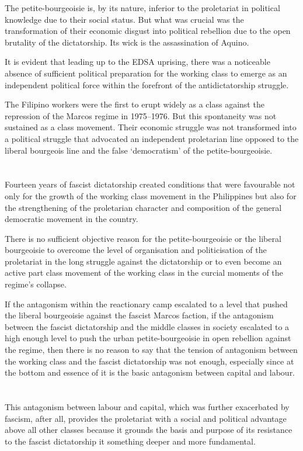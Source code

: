The petite-bourgeoisie is, by its nature,
inferior to the proletariat 
in political knowledge 
due to their social status. 
But what was crucial was the transformation 
of their economic disgust into political rebellion 
due to the open brutality of the dictatorship. 
Its wick is the assassination of Aquino.

It is evident that leading up to the EDSA uprising, 
there was a noticeable absence of 
sufficient political preparation for 
the working class to emerge 
as an independent political force 
within the forefront of the antidictatorship struggle.

The Filipino workers were the first to erupt 
widely as a class against the repression 
of the Marcos regime in 1975--1976. 
But this spontaneity was not sustained as a class movement. 
Their economic struggle was not transformed 
into a political struggle 
that advocated an independent proletarian line 
opposed to the liberal bourgeois line 
and the false `democratism' of the petite-bourgeoisie.


\section{}
Fourteen years of fascist dictatorship 
created conditions that were favourable not only 
for the growth of the working class movement in the Philippines 
but also for the strengthening of the proletarian character 
and composition of the general democratic movement in the country.

There is no sufficient objective reason 
for the petite-bourgeoisie or the liberal bourgeoisie 
to overcome the level of organisation and politicisation of the proletariat 
in the long struggle against the dictatorship 
or to even become an active part 
class movement of the working class 
in the curcial moments of the regime's collapse.

If the antagonism within the reactionary camp 
escalated to a level that
pushed the liberal bourgeoisie against the fascist Marcos faction, 
if the antagonism between the fascist dictatorship 
and the middle classes in society 
escalated to a high enough level 
to push the urban petite-bourgeoisie 
in open rebellion against the regime, 
then there is no reason to say that the tension of antagonism 
between the working class and the fascist dictatorship was not enough, 
especially since at the bottom and essence of it 
is the basic antagonism between capital and labour.


\section{}
This antagonism between labour and capital, 
which was further exacerbated by fascism, 
after all, 
provides the proletariat with 
a social and political advantage
above all other classes
because it grounds the basis and purpose of its resistance 
to the fascist dictatorship 
it something deeper and more fundamental.

